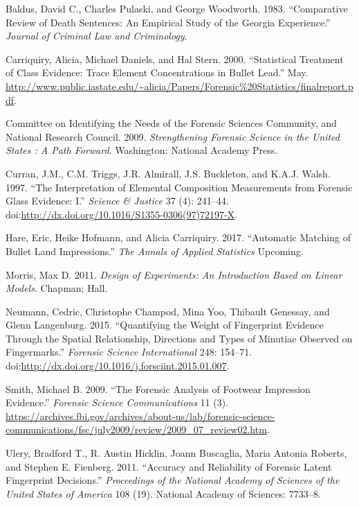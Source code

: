\documentclass[]{book}
\theoremstyle{definition}
\theoremstyle{definition}
\theoremstyle{remark}
\begin{document}
\hypertarget{ref-baldus}{}
Baldus, David C., Charles Pulaski, and George Woodworth. 1983.
``Comparative Review of Death Sentences: An Empirical Study of the
Georgia Experience.'' \emph{Journal of Criminal Law and Criminology}.

\hypertarget{ref-aliciaetal}{}
Carriquiry, Alicia, Michael Daniels, and Hal Stern. 2000. ``Statistical
Treatment of Class Evidence: Trace Element Concentrations in Bullet
Lead.'' May.
\url{http://www.public.iastate.edu/~alicia/Papers/Forensic\%20Statistics/finalreport.pdf}.

\hypertarget{ref-nrc09}{}
Committee on Identifying the Needs of the Forensic Sciences Community,
and National Research Council. 2009. \emph{Strengthening Forensic
Science in the United States : A Path Forward}. Washington: National
Academy Press.

\hypertarget{ref-curranetal}{}
Curran, J.M., C.M. Triggs, J.R. Almirall, J.S. Buckleton, and K.A.J.
Walsh. 1997. ``The Interpretation of Elemental Composition Measurements
from Forensic Glass Evidence: I.'' \emph{Science \& Justice} 37 (4):
241--44.
doi:\href{https://doi.org/http://dx.doi.org/10.1016/S1355-0306(97)72197-X}{http://dx.doi.org/10.1016/S1355-0306(97)72197-X}.

\hypertarget{ref-hare}{}
Hare, Eric, Heike Hofmann, and Alicia Carriquiry. 2017. ``Automatic
Matching of Bullet Land Impressions.'' \emph{The Annals of Applied
Statistics} Upcoming.

\hypertarget{ref-doe}{}
Morris, Max D. 2011. \emph{Design of Experiments: An Introduction Based
on Linear Models}. Chapman; Hall.

\hypertarget{ref-neumann15}{}
Neumann, Cedric, Christophe Champod, Mina Yoo, Thibault Genessay, and
Glenn Langenburg. 2015. ``Quantifying the Weight of Fingerprint Evidence
Through the Spatial Relationship, Directions and Types of Minutiae
Observed on Fingermarks.'' \emph{Forensic Science International} 248:
154--71.
doi:\href{https://doi.org/http://dx.doi.org/10.1016/j.forsciint.2015.01.007}{http://dx.doi.org/10.1016/j.forsciint.2015.01.007}.

\hypertarget{ref-shoepic}{}
Smith, Michael B. 2009. ``The Forensic Analysis of Footwear Impression
Evidence.'' \emph{Forensic Science Communications} 11 (3).
\url{https://archives.fbi.gov/archives/about-us/lab/forensic-science-communications/fsc/july2009/review/2009_07_review02.htm}.

\hypertarget{ref-uleryetal}{}
Ulery, Bradford T., R. Austin Hicklin, Joann Buscaglia, Maria Antonia
Roberts, and Stephen E. Fienberg. 2011. ``Accuracy and Reliability of
Forensic Latent Fingerprint Decisions.'' \emph{Proceedings of the
National Academy of Sciences of the United States of America} 108 (19).
National Academy of Sciences: 7733--8.
\end{document}
